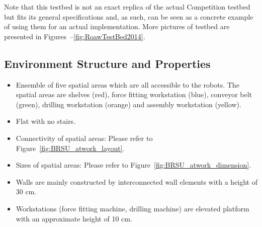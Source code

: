 %

Note that this \erlir testbed is not an exact replica of the actual \erlir Competition testbed but fits its general specifications and, as such, can be seen as a concrete example of using them for an actual implementation. 
More pictures of \erlir testbed are presented in Figures~\protect{\ref{fig:TaskRelatedObjects}}--\ref{fig:RoawTestBed2014}.

\subsection{Environment Structure and Properties}

\begin{itemize}
 \item Ensemble of five spatial areas which are all accessible to the robots.
 The spatial areas are shelves (red), force fitting workstation (blue), conveyor belt (green), drilling workstation (orange) and assembly workstation (yellow).
 \item Flat with no stairs.
 \item Connectivity of spatial areas:  Please refer to Figure~\ref{fig:BRSU_atwork_layout}.
 \item Sizes of spatial areas: Please refer to Figure~\ref{fig:BRSU_atwork_dimension}.
 \item Walls are mainly constructed by interconnected wall elements with a height of 30 cm.
 \item Workstations (force fitting machine, drilling machine) are elevated platform with an approximate height of 10 cm. 
 \end{itemize}


